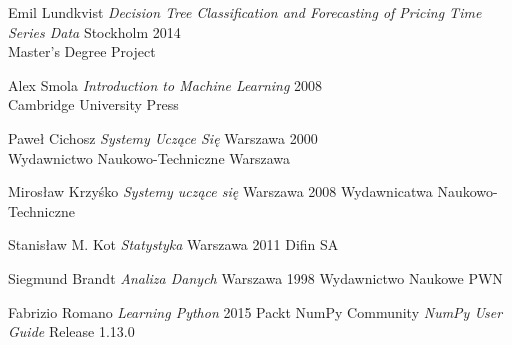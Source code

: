 \documentclass[man,mfi|min|mpt|mok|mub|mza|miz|bsp]{mgrwms}
\begin{document}
\begin{thebibliography}{88}
 Emil Lundkvist
\textit{Decision Tree Classiﬁcation and Forecasting of Pricing Time Series Data} Stockholm 2014\\
Master’s Degree Project

 Alex Smola
\textit{Introduction to Machine Learning} 2008\\
Cambridge University Press

 Paweł Cichosz
\textit{Systemy Uczące Się} Warszawa 2000\\
Wydawnictwo Naukowo-Techniczne Warszawa

 Mirosław Krzyśko
\textit{Systemy uczące się} Warszawa 2008
Wydawnicatwa Naukowo-Techniczne

 Stanisław M. Kot
\textit{Statystyka} Warszawa 2011
Difin SA

 Siegmund Brandt
\textit{Analiza Danych} Warszawa 1998
Wydawnictwo Naukowe PWN

 Fabrizio Romano
\textit{Learning Python} 2015
Packt
 NumPy Community
\textit{NumPy User Guide} Release 1.13.0

\end{thebibliography}
%
%  
%
\listoffigures
%
\listoftables
%
\end{document}
